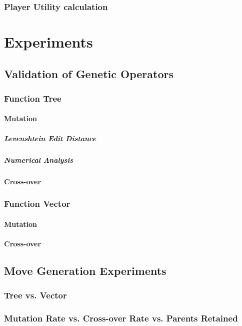 \documentclass{acm_proc_article-sp}
\begin{document}
        \subsubsection{Player Utility calculation}
        
            
\section{Experiments}

    \subsection{Validation of Genetic Operators}
        \subsubsection{Function Tree}
            \paragraph{Mutation}
                \subparagraph{Levenshtein Edit Distance}
                \subparagraph{Numerical Analysis}        
            \paragraph{Cross-over}
        \subsubsection{Function Vector}
            \paragraph{Mutation}
            \paragraph{Cross-over}
    
    \subsection{Move Generation Experiments}
    
        \subsubsection{Tree vs. Vector}
        \subsubsection{Mutation Rate vs. Cross-over Rate vs. Parents Retained}
\end{document}
